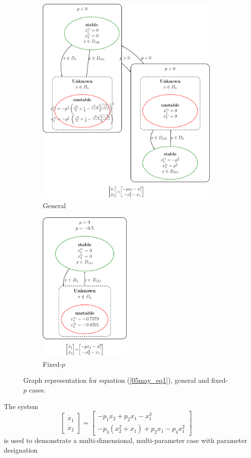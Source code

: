 \documentclass[12pt]{article}
\begin{document}
\begin{figure}[H]
\centering
\begin{subfigure}[b]{0.6\textwidth}
	\centering
	\includegraphics[width=3.8in]{may05_graph_MD1.pdf}
	\caption{General}
\end{subfigure}
\qquad \qquad
\begin{subfigure}[b]{0.3\textwidth}
	\centering
	\includegraphics[width=1.8in]{may05_graph_MD2.pdf}
	\caption{Fixed-$p$}
\end{subfigure}
\caption{Graph representation for equation (\ref{05may_eq1}), general and fixed-$p$ cases.}
\label{may05_graph_MD}
\end{figure}

The system
\begin{equation}
\label{05may_eq2}
\begin{bmatrix}
\dot{x}_1 \\ \dot{x}_2
\end{bmatrix}
=
\begin{bmatrix}
-p_1x_2+p_2x_1-x_1^3 \\ -p_3\left(x_2^2+x_1\right)+p_2x_1-p_4x_1^2
\end{bmatrix}
\end{equation}
is used to demonstrate a multi-dimensional, multi-parameter case with parameter designation 
\end{document}
